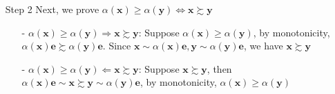 \begin{enumerate}
\begin{enumerate}
        \item[Step 2] Next, we prove $\alpha(\mathbf{x})\geq \alpha(\mathbf{y})\Leftrightarrow \mathbf{x}\succsim\mathbf{y}$
            \begin{enumerate}
                \item[-] $\alpha(\mathbf{x})\geq \alpha(\mathbf{y})\Rightarrow \mathbf{x}\succsim\mathbf{y}$: Suppose $\alpha(\mathbf{x})\geq \alpha(\mathbf{y})$, by monotonicity, $\alpha(\mathbf{x})\mathbf{e}\succsim \alpha(\mathbf{y})\mathbf{e}$. Since $\mathbf{x}\sim \alpha(\mathbf{x})\mathbf{e},\mathbf{y}\sim\alpha(\mathbf{y})\mathbf{e}$, we have $\mathbf{x}\succsim \mathbf{y}$
                \item[-] $\alpha(\mathbf{x})\geq \alpha(\mathbf{y})\Leftarrow \mathbf{x}\succsim\mathbf{y}$: Suppose $\mathbf{x}\succsim \mathbf{y}$, then $\alpha(\mathbf{x})\mathbf{e}\sim\mathbf{x}\succsim \mathbf{y}\sim\alpha(\mathbf{y})\mathbf{e}$, by monotonicity, $\alpha(\mathbf{x})\geq \alpha(\mathbf{y})$
            \end{enumerate}
        

\end{enumerate}
\end{enumerate}
